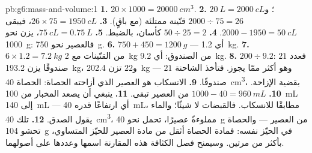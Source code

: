 \begin{solution}{pb:g6:mass-and-volume:1}
\textbf{1.} $20 \times 1000 = \qty{20000}{cm^3}$.
\textbf{2.} $\qty{20}{L} = \qty{2000}{cL}$؛ و$2000 \div 75 = 26$
قنّينة ممتلئة (مع باقٍ).
\textbf{3.} $26 \times 75 = \qty{1950}{cL}$، فيبقى $2000 - 1950 =
\qty{50}{cL}$.
\textbf{4.} $50 \div 25 = 2$ كأسان، بالضبط.
\textbf{5.} $\qty{75}{cL} = \qty{0.75}{L}$،  يزن نحو
\qty{1000}{g}: فالعصير نحو \qty{750}{g}.
\textbf{6.} $750 + 450 = \qty{1200}{g}$ --- أي \qty{1.2}{kg}.
\textbf{7.} $6 \times 1.2 = \qty{7.2}{kg}$ من القنّينات مع
\qty{2}{kg} من الصندوق: أي \qty{9.2}{kg}.
\textbf{8.} $200 \div 9.2$: فعدد $21$ صندوقًا يزن \qty{193.2}{kg}،
و$22$ تزن \qty{202.4}{kg} --- وهو أكثر ممّا يجوز. فتأخذ الشاحنة
$21$ صندوقًا.
\textbf{9.} الانسكاب هو العصير الذي أزاحته الحصاة:  الحصاة
\qty{40}{cm^3}، بقضية الإزاحة.
\textbf{10.} $1000 - 40 = \qty{960}{mL}$ من العصير تبقى.
\textbf{11.} ينبغي أن يصعد المخبار من \qty{100}{mL} إلى
\qty{140}{mL} --- أي ارتفاعًا قدره \qty{40}{mL}، مطابقًا
للانسكاب. فالقبضات لا  شيئًا؛ والماء يقول الصدق.
\textbf{12.} تلك \qty{40}{cm^3}، مملوءةً عصيرًا، تحمل نحو
\qty{40}{g} من العصير --- والحصاة تحشو \qty{104}{g} في الحيّز
نفسه: فمادة الحصاة أثقل من مادة العصير للحيّز المتساوي، بأكثر
من مرتين. وسيمنح فصل الكثافة هذه المقارنة اسمها وعددها على
أصولهما.
\end{solution}
